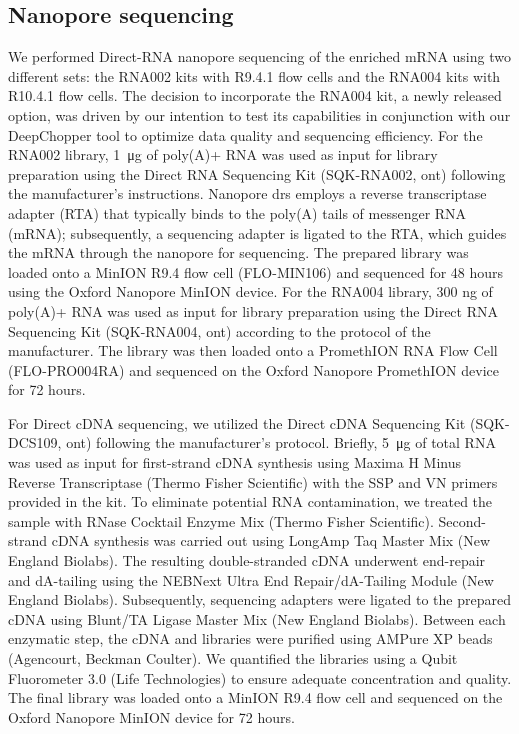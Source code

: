 \documentclass[pdflatex,sn-nature, lineno]{sn-jnl}%
\theoremstyle{thmstyleone}%
\theoremstyle{thmstyletwo}%
\theoremstyle{thmstylethree}%
\begin{document}
\subsection{Nanopore sequencing}

We performed Direct-RNA nanopore sequencing of the enriched mRNA using two different sets: the RNA002 kits with R9.4.1 flow cells and the RNA004 kits with R10.4.1 flow cells.
The decision to incorporate the RNA004 kit, a newly released option, was driven by our intention to test its capabilities in conjunction with our DeepChopper tool to optimize data quality and sequencing efficiency.
For the RNA002 library, \SI{1}{\micro\gram} of poly(A)+ RNA was used as input for library preparation using the Direct RNA Sequencing Kit (SQK-RNA002, \gls{ont}) following the manufacturer's instructions.
Nanopore \gls{drs} employs a reverse transcriptase adapter (RTA) that typically binds to the poly(A) tails of messenger RNA (mRNA); subsequently, a sequencing adapter is ligated to the RTA, which guides the mRNA through the nanopore for sequencing.
The prepared library was loaded onto a MinION R9.4 flow cell (FLO-MIN106) and sequenced for 48 hours using the Oxford Nanopore MinION device.
For the RNA004 library, 300 ng of poly(A)+ RNA was used as input for library preparation using the Direct RNA Sequencing Kit (SQK-RNA004, \gls{ont}) according to the protocol of the manufacturer.
The library was then loaded onto a PromethION RNA Flow Cell (FLO-PRO004RA) and sequenced on the Oxford Nanopore PromethION device for 72 hours.

For Direct cDNA sequencing, we utilized the Direct cDNA Sequencing Kit (SQK-DCS109, \gls{ont}) following the manufacturer's protocol.
Briefly, \SI{5}{\micro\gram}  of total RNA was used as input for first-strand cDNA synthesis using Maxima H Minus Reverse Transcriptase (Thermo Fisher Scientific) with the SSP and VN primers provided in the kit.
To eliminate potential RNA contamination, we treated the sample with RNase Cocktail Enzyme Mix (Thermo Fisher Scientific).
Second-strand cDNA synthesis was carried out using LongAmp Taq Master Mix (New England Biolabs).
The resulting double-stranded cDNA underwent end-repair and dA-tailing using the NEBNext Ultra End Repair/dA-Tailing Module (New England Biolabs).
Subsequently, sequencing adapters were ligated to the prepared cDNA using Blunt/TA Ligase Master Mix (New England Biolabs).
Between each enzymatic step, the cDNA and libraries were purified using AMPure XP beads (Agencourt, Beckman Coulter).
We quantified the libraries using a Qubit Fluorometer 3.0 (Life Technologies) to ensure adequate concentration and quality.
The final library was loaded onto a MinION R9.4 flow cell and sequenced on the Oxford Nanopore MinION device for 72 hours.
\end{document}
